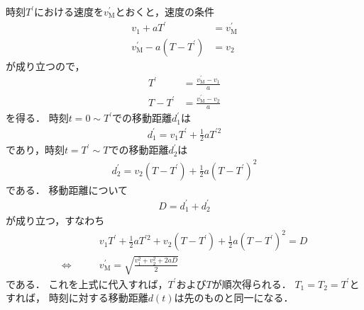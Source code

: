 ﻿\documentclass[a4paper]{jsarticle}
\begin{document}
時刻$T^{\prime}$における速度を$v_{\mathrm{M}}^{\prime}$とおくと，速度の条件
\begin{align}
v_{1}+aT^{\prime}&=v_{\mathrm{M}}^{\prime} \\
v_{\mathrm{M}}^{\prime}-a(T-T^{\prime})&=v_{2}
\end{align}
が成り立つので，
\begin{align}
T^{\prime}&=\frac{v_{\mathrm{M}}^{\prime}-v_{1}}{a} \\
T-T^{\prime}&=\frac{v_{\mathrm{M}}^{\prime}-v_{2}}{a}
\end{align}
を得る．
時刻$t=0\sim T^{\prime}$での移動距離$d_{1}^{\prime}$は
\begin{align}
d_{1}^{\prime}=v_{1}T^{\prime}+\frac{1}{2}aT^{\prime 2}
\end{align}
であり，時刻$t=T^{\prime}\sim T$での移動距離$d_{2}^{\prime}$は
\begin{align}
d_{2}^{\prime}=v_{2}(T-T^{\prime})+\frac{1}{2}a(T-T^{\prime})^{2}
\end{align}
である．
移動距離について
\begin{align}
D=d_{1}^{\prime}+d_{2}^{\prime}
\end{align}
が成り立つ，すなわち
\begin{align}
&v_{1}T^{\prime}+\frac{1}{2}aT^{\prime 2}
+v_{2}(T-T^{\prime})+\frac{1}{2}a(T-T^{\prime})^{2}
=D
\nonumber \\
\Leftrightarrow\qquad&
v_{\mathrm{M}}^{\prime}=\sqrt{\frac{v_{1}^{2}+v_{2}^{2}+2aD}{2}}
\end{align}
である．
これを上式に代入すれば，$T^{\prime}$および$T$が順次得られる．
$T_{1}=T_{2}=T^{\prime}$とすれば，
時刻に対する移動距離$d(t)$は先のものと同一になる．


\end{document}
